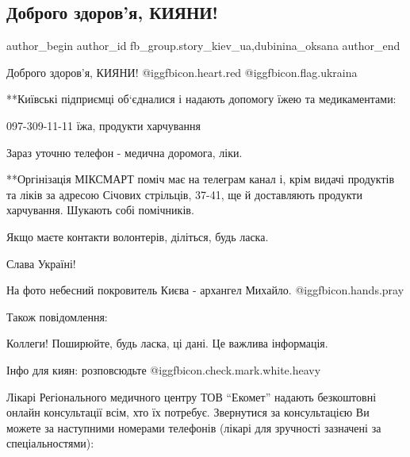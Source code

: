  
 
 
 
 
 
\subsection{Доброго здоров’я, КИЯНИ!}
\label{sec:02_03_2022.fb.fb_group.story_kiev_ua.2.dobrogo_zdorovja_kijany}
 
\ifcmt
 author_begin
   author_id fb_group.story_kiev_ua,dubinina_oksana
 author_end
\fi


Доброго здоров’я, КИЯНИ! @igg{fbicon.heart.red} @igg{fbicon.flag.ukraina}

**Київські підприємці об‘єдналися і надають допомогу їжею та медикаментами:

097-309-11-11 їжа, продукти харчування

Зараз уточню телефон - медична доромога, ліки.

**Оргінізація МІКСМАРТ поміч має на телеграм канал і, крім видачі продуктів та
ліків за адресою Січових стрільців, 37-41, ще й доставляють продукти
харчування. Шукають собі помічників.

Якщо маєте контакти волонтерів, діліться, будь ласка.

Слава Україні! 

На фото небесний покровитель Києва - архангел Михайло. @igg{fbicon.hands.pray} 

Також повідомлення:

Коллеги! Поширюйте, будь ласка, ці дані. Це важлива інформація.

Інфо для киян: розповсюдьте @igg{fbicon.check.mark.white.heavy} 

Лікарі Регіонального медичного центру ТОВ \enquote{Екомет} надають безкоштовні онлайн
консультації всім, хто їх потребує. Звернутися за консультацією Ви можете за
наступними номерами телефонів (лікарі для зручності зазначені за
спеціальностями):

